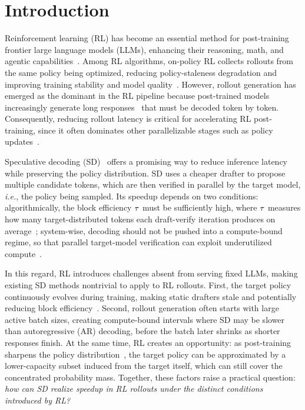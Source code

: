 \section{Introduction}
\label{sec:introduction}

Reinforcement learning (RL) has become an essential method for post-training frontier large language models (LLMs), enhancing their reasoning, math, and agentic capabilities~\citep{guo2025deepseek, yang2025qwen3, team2025kimi, zeng2025glm}.
Among RL algorithms, on-policy RL collects rollouts from the same policy being optimized, reducing policy-staleness degradation and improving training stability and model quality~\citep{kumar2025llm,fu2025areal}.
However, rollout generation has emerged as the dominant \bottleneck{} in the RL pipeline because post-trained models increasingly generate long responses~\citep{chen2024not,guo2025deepseek,yu2025dapo,liu2025understanding} that must be decoded token by token.
Consequently, reducing rollout latency is critical for accelerating RL post-training, since it often dominates other parallelizable stages such as policy updates~\citep{schulman2017proximal}.

Speculative decoding (SD)~\citep{leviathan2023fast,chen2023accelerating} offers a promising way to reduce inference latency while preserving the policy distribution.
SD uses a cheaper drafter to propose multiple candidate tokens, which are then verified in parallel by the target model, \textit{i.e.}, the policy being sampled.
Its speedup depends on two conditions: algorithmically, the block efficiency $\tau$ must be sufficiently high, where $\tau$ measures how many target-distributed tokens each draft-verify iteration produces on average~\citep{zhou2024distillspec,liu2025speculative};
system-wise, decoding should not be pushed into a compute-bound regime, so that parallel target-model verification can exploit underutilized compute~\citep{leviathan2023fast,sadhukhan2024magicdec,liu2025speculative}.



In this regard, RL introduces challenges absent from serving fixed LLMs, making existing SD methods nontrivial to apply to RL rollouts.
First, the target policy continuously evolves during training, making static drafters stale and potentially reducing block efficiency~\citep{zhang2025fastgrpo}.
Second, rollout generation often starts with large active batch sizes, creating compute-bound intervals where SD may be slower than autoregressive (AR) decoding, before the batch later shrinks as shorter responses finish.
At the same time, RL creates an opportunity: as post-training sharpens the policy distribution~\citep{zhao2025echo}, the target policy can be approximated by a lower-capacity subset induced from the target itself, which can still cover the concentrated probability mass.
Together, these factors raise a practical question: \emph{how can SD realize speedup in RL rollouts under the distinct conditions introduced by RL?}

